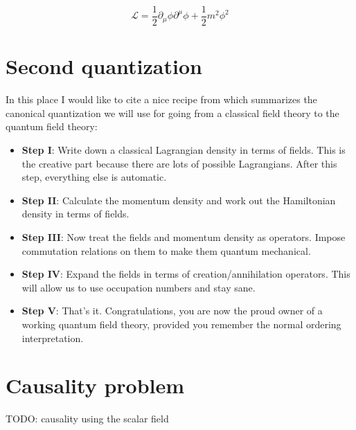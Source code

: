 \begin{equation}
    \label{eq:klein_gordon_field}
    \mathcal{L} = \frac{1}{2} \partial_{\mu} \phi \partial^{\mu} \phi + \frac{1}{2} m^{2} \phi^{2}
\end{equation}

\section{Second quantization}

In this place I would like to cite a nice recipe from \cite{gifted_amateur} which summarizes
the canonical quantization we will use for going from a classical field theory to the quantum 
field theory:

\begin{itemize}
    \item \textbf{Step I}: Write down a classical Lagrangian density in terms of fields. This is the creative part because there are lots of 
        possible Lagrangians. After this step, everything else is automatic.
    \item \textbf{Step II}: Calculate the momentum density and work out the Hamiltonian density in terms of fields.
    \item \textbf{Step III}: Now treat the fields and momentum density as operators. Impose commutation relations on them to make them 
        quantum mechanical.
    \item \textbf{Step IV}: Expand the fields in terms of creation/annihilation operators. This will allow us to use occupation numbers 
        and stay sane.
    \item \textbf{Step V}: That's it. Congratulations, you are now the proud owner of a working quantum field theory, provided you remember 
        the normal ordering interpretation.
\end{itemize}

\section{Causality problem}

TODO: causality using the scalar field
